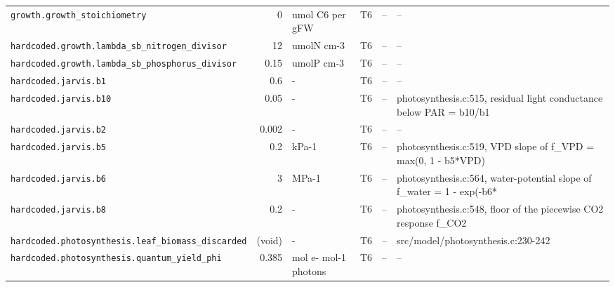 \documentclass[a4paper,11pt]{article}
\begin{document}
\begin{table}[!htbp]
\begin{tabular}{@{}p{52mm}rp{20mm}cp{20mm}p{38mm}@{}}
\texttt{growth.growth\_stoichiometry} & 0 & umol C6 per gFW & T6 & -- & -- \\
\texttt{hardcoded.growth.lambda\_sb\_nitrogen\_divisor} & 12 & umolN cm-3 & T6 & -- & -- \\
\texttt{hardcoded.growth.lambda\_sb\_phosphorus\_divisor} & 0.15 & umolP cm-3 & T6 & -- & -- \\
\texttt{hardcoded.jarvis.b1} & 0.6 & - & T6 & -- & -- \\
\texttt{hardcoded.jarvis.b10} & 0.05 & - & T6 & -- & photosynthesis.c:515, residual light conductance below PAR = b10/b1 \\
\texttt{hardcoded.jarvis.b2} & 0.002 & - & T6 & -- & -- \\
\texttt{hardcoded.jarvis.b5} & 0.2 & kPa-1 & T6 & -- & photosynthesis.c:519, VPD slope of f\_VPD = max(0, 1 - b5*VPD) \\
\texttt{hardcoded.jarvis.b6} & 3 & MPa-1 & T6 & -- & photosynthesis.c:564, water-potential slope of f\_water = 1 - exp(-b6* \\
\texttt{hardcoded.jarvis.b8} & 0.2 & - & T6 & -- & photosynthesis.c:548, floor of the piecewise CO2 response f\_CO2 \\
\texttt{hardcoded.photosynthesis.leaf\_biomass\_discarded} & (void) & - & T6 & -- & src/model/photosynthesis.c:230-242 \\
\texttt{hardcoded.photosynthesis.quantum\_yield\_phi} & 0.385 & mol e- mol-1 photons & T6 & -- & -- \\
\bottomrule
\end{tabular}
\end{table}
\end{document}
